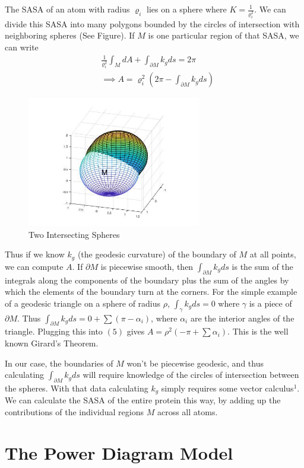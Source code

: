 \documentclass{article}
\begin{document}
The SASA of an atom with radius $\varrho_i$ lies on a sphere where $K=\frac{1}{\varrho_i^2}$. We can divide this SASA into many polygons bounded by the circles of intersection with neighboring spheres (See Figure). If $M$ is one particular region of that SASA, we can write 
\begin{align}\nonumber
&\frac{1}{\varrho_i^2}\int_M dA + \int_{\partial M} k_g ds= 2\pi \\
&\implies A=\varrho_i^2\left(2\pi-\int_{\partial M} k_g ds\right)
\end{align}

\begin{figure}[h!]
\caption{Two Intersecting Spheres}
\centerline{\includegraphics[width=3in]{spheres}}
\end{figure}
Thus if we know $k_g$ (the geodesic curvature) of the boundary of $M$ at all points, we can compute $A$. If $\partial M$ is piecewise smooth, then $\int_{\partial M} k_g ds$ is the sum of the integrals along the components of the boundary plus the sum of the angles by which the elements of the boundary turn at the corners. For the simple example of a geodesic triangle on a sphere of radius $\rho$, $\int_\gamma k_g ds=0$ where $\gamma$ is a piece of $\partial M$. Thus $\int_{\partial M} k_g ds=0+\sum (\pi-\alpha_i)$, where $\alpha_i$ are the interior angles of the triangle. Plugging this into $(5)$ gives $A=\rho^2(-\pi+\sum\alpha_i)$. This is the well known Girard's Theorem. 

In our case, the boundaries of $M$ won't be piecewise geodesic, and thus calculating $\int_{\partial M} k_g ds$ will require knowledge of the circles of intersection between the spheres. With that data calculating $k_g$ simply requires some vector calculus$^1$.
We can calculate the SASA of the entire protein this way, by adding up the contributions of the individual regions $M$ across all atoms.

\section{The Power Diagram Model}
\end{document}
